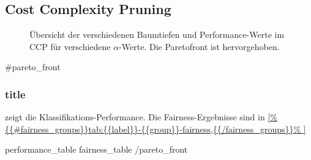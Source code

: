 \subsection{Cost Complexity Pruning}

\begin{figure}[ht]
  \centering
  \caption{Übersicht der verschiedenen Baumtiefen und Performance-Werte
    im CCP für verschiedene \(\alpha\)-Werte. Die Paretofront ist
    hervorgehoben.}
\end{figure}

{{#pareto_front}}
\clearpage
\subsubsection{ {{title}} }
 zeigt die Klassifikations-Performance.
Die Fairness-Ergebnisse sind in
\cref{%
  {{#fairness_groups}}tab:{{label}}-{{group}}-fairness,{{/fairness_groups}}%
  }

{{{performance_table}}}
{{{fairness_table}}}
{{/pareto_front}}
